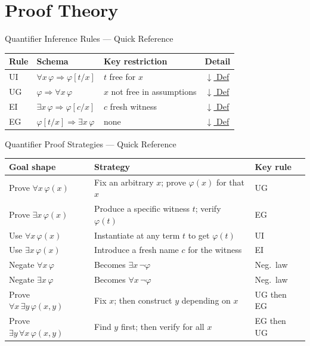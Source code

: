 \section{Proof Theory}


\begin{toolkitbox}{Quantifier Inference Rules --- Quick Reference}
\small
\begin{tabular}{l l l l}
\toprule
\textbf{Rule} & \textbf{Schema} & \textbf{Key restriction} & \textbf{Detail} \\
\midrule
UI  & $\forall x\,\varphi \Rightarrow \varphi[t/x]$ & $t$ free for $x$ & \hyperref[def:ui]{$\downarrow$ Def} \\
UG  & $\varphi \Rightarrow \forall x\,\varphi$ & $x$ not free in assumptions & \hyperref[def:ug]{$\downarrow$ Def} \\
EI  & $\exists x\,\varphi \Rightarrow \varphi[c/x]$ & $c$ fresh witness & \hyperref[def:ei]{$\downarrow$ Def} \\
EG  & $\varphi[t/x] \Rightarrow \exists x\,\varphi$ & none & \hyperref[def:eg]{$\downarrow$ Def} \\
\bottomrule
\end{tabular}
\end{toolkitbox}



\begin{toolkitbox}{Quantifier Proof Strategies --- Quick Reference}
\small
\begin{tabular}{l l l}
\toprule
\textbf{Goal shape} & \textbf{Strategy} & \textbf{Key rule} \\
\midrule
Prove $\forall x\,\varphi(x)$  & Fix an arbitrary $x$; prove $\varphi(x)$ for that $x$  & UG \\
Prove $\exists x\,\varphi(x)$  & Produce a specific witness $t$; verify $\varphi(t)$     & EG \\
Use $\forall x\,\varphi(x)$    & Instantiate at any term $t$ to get $\varphi(t)$         & UI \\
Use $\exists x\,\varphi(x)$    & Introduce a fresh name $c$ for the witness             & EI \\
Negate $\forall x\,\varphi$    & Becomes $\exists x\,\neg\varphi$                        & Neg.\ law \\
Negate $\exists x\,\varphi$    & Becomes $\forall x\,\neg\varphi$                        & Neg.\ law \\
\midrule
Prove $\forall x\,\exists y\,\varphi(x,y)$ & Fix $x$; then construct $y$ depending on $x$ & UG then EG \\
Prove $\exists y\,\forall x\,\varphi(x,y)$ & Find $y$ first; then verify for all $x$       & EG then UG \\
\bottomrule
\end{tabular}
\end{toolkitbox}

